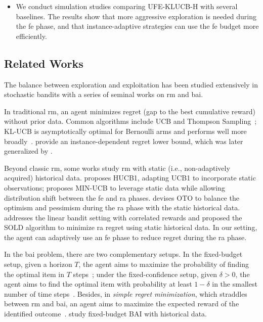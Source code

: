 \documentclass[twoside,11pt]{article}
\newcommand{\ouralg}{\textsc{UFE-KLUCB-H}}
\begin{document}
\begin{itemize}[leftmargin=*]
\item 
We conduct simulation studies comparing \ouralg{} with several baselines. The results show that more aggressive exploration is needed during the \ac{fe} phase, and that instance-adaptive strategies can use the \ac{fe} budget more efficiently.

\end{itemize}


\subsection{Related Works} 

The balance between exploration and exploitation has been studied extensively in stochastic bandits with a series of seminal works on \ac{rm} and \ac{bai}.

In traditional \ac{rm}, an agent minimizes regret (gap to the best cumulative reward) without prior data. Common algorithms include UCB and Thompson Sampling~\citep{auer2002finite,agrawal2017near}; KL-UCB is asymptotically optimal for Bernoulli arms and performs well more broadly~\citep{garivier2011KLUCB}.  \citet{lai1985asymptotically} provide an instance-dependent regret lower bound, which was later generalized by \citet{burnetas96}.

Beyond classic \ac{rm}, some works study \ac{rm} with static (i.e., non-adaptively acquired) historical data. \citet{shivaswamy2012multi} proposes HUCB1, adapting UCB1 to incorporate static observations; \citet{cheung2024leveraging} proposes MIN-UCB to leverage static data while allowing distribution shift between the \ac{fe} and \ac{ra} phases. \citet{flore2025balancing} devises OTO to balance the optimism and pessimism during the \ac{ra} phase with the static historical data. \citet{kausik2025leveraging} addresses the linear bandit setting with correlated rewards and proposed the  SOLD algorithm to minimize \ac{ra} regret using static historical data.
In our setting, the agent can adaptively use an \ac{fe} phase to reduce regret during the \ac{ra} phase.

In the \ac{bai} problem, there are two complementary setups. In the fixed-budget setup, given a horizon $T$, the agent aims to maximize the probability of finding the optimal  item in  $T$ steps~\citep{audibert2010best,karnin2013optimal,zhong2021probabilistic,carpentier16tight}; under the fixed-confidence setup, given $\delta > 0$, the agent aims to find the optimal item with  probability at least $1 - \delta$ in the smallest number of time steps~\citep{bubeck2013multiple,kaufmann13information}.
Besides, in  {\em simple regret minimization}, which straddles between \ac{rm} and \ac{bai}, an agent aims to maximize the expected reward of the identified outcome~\citep{carpentier2015simple,zhao2023revisiting}.  \citet{yang25} study fixed-budget BAI with historical data.
\end{document}
